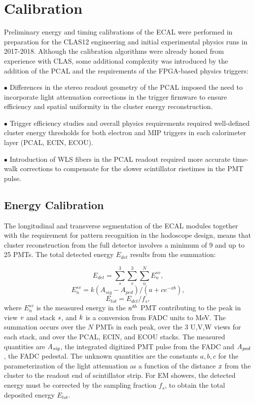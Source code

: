 \section{Calibration}
\label{Calibration}

Preliminary energy and timing calibrations of the ECAL were performed in preparation for the CLAS12 engineering
and initial experimental physics runs in 2017-2018. Although the calibration algorithms were already honed from
experience with CLAS, some additional complexity was introduced by the addition of the PCAL and the requirements
of the FPGA-based physics triggers: 

$\bullet$ Differences in the stereo readout geometry of the PCAL imposed the need to incorporate light attenuation
corrections in the trigger firmware to ensure efficiency and spatial uniformity in the cluster energy reconstruction.

$\bullet$ Trigger efficiency studies and overall physics requirements required well-defined cluster energy
thresholds for both electron and MIP triggers in each calorimeter layer (PCAL, ECIN, ECOU).

$\bullet$ Introduction of WLS fibers in the PCAL readout required more accurate time-walk corrections to
compensate for the slower scintillator risetimes in the PMT pulse.

\subsection{Energy Calibration}

The longitudinal and transverse segmentation of the ECAL modules together with the requirement for pattern
recognition in the hodoscope design, means that cluster reconstruction from the full detector involves a minimum
of 9 and up to 25 PMTs. The total detected energy $E_{det}$ results from the summation:

\begin{equation}
 E_{det} = \sum_{s}^{3} \sum_{v}^{3} \sum_{n}^{N} E_{n}^{sv},\label{eq:E1}
\end{equation}
\begin{equation}
 E_{n}^{sv} = k(A_{sig}-A_{ped})/(a+c e^{-xb}),   \label{eq:E2}
\end{equation}
\begin{equation}
 E_{tot} = E_{det}/f_{s},                 \label{eq:E3}
\end{equation}
where $E_{n}^{sv}$ is the measured energy in the ${\it n^{th}}$ PMT contributing to the peak in view ${\it v}$ and
stack ${\it s}$, and ${\it k}$ is a conversion from FADC units to MeV. The summation occurs over the $N$ PMTs
in each peak, over the 3 U,V,W views for each stack, and over the PCAL, ECIN, and ECOU stacks. The measured
quantities are ${\it A_{sig}}$, the integrated digitized PMT pulse from the FADC and ${\it A_{ped}}$, the FADC
pedestal. The unknown quantities are the constants $a,b,c$ for the parameterization of the light attenuation as a
function of the distance ${\it x}$ from the cluster to the readout end of scintillator strip. For EM showers, the
detected energy must be corrected by the sampling fraction $f_{s}$, to obtain the total deposited energy $E_{tot}$.  

